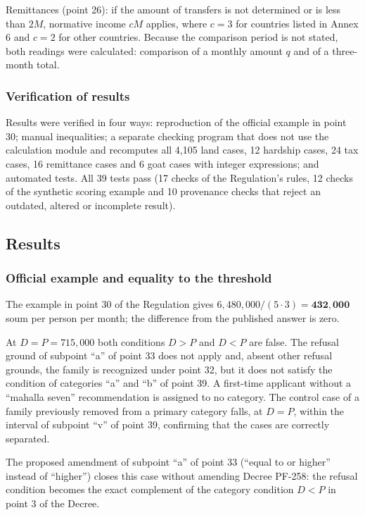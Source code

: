 \documentclass[14pt,a4paper]{extarticle}
\begin{document}
Remittances (point 26): if the amount of transfers is not determined or is less than $2M$, normative income $cM$ applies, where $c=3$ for countries listed in Annex 6 and $c=2$ for other countries. Because the comparison period is not stated, both readings were calculated: comparison of a monthly amount $q$ and of a three-month total.

\subsubsection{Verification of results}
Results were verified in four ways: reproduction of the official example in point 30; manual inequalities; a separate checking program that does not use the calculation module and recomputes all 4,105 land cases, 12 hardship cases, 24 tax cases, 16 remittance cases and 6 goat cases with integer expressions; and automated tests. All 39 tests pass (17 checks of the Regulation’s rules, 12 checks of the synthetic scoring example and 10 provenance checks that reject an outdated, altered or incomplete result).

\subsection{Results}
\subsubsection{Official example and equality to the threshold}\label{res:eq}
The example in point 30 of the Regulation gives $6{,}480{,}000/(5\cdot3)=\mathbf{432{,}000}$ soum per person per month; the difference from the published answer is zero.

At $D=P=715{,}000$ both conditions $D>P$ and $D<P$ are false. The refusal ground of subpoint “a” of point 33 does not apply and, absent other refusal grounds, the family is recognized under point 32, but it does not satisfy the condition of categories “a” and “b” of point 39. A first-time applicant without a “mahalla seven” recommendation is assigned to no category. The control case of a family previously removed from a primary category falls, at $D=P$, within the interval of subpoint “v” of point 39, confirming that the cases are correctly separated.

The proposed amendment of subpoint “a” of point 33 (“equal to or higher” instead of “higher”) closes this case without amending Decree PF-258: the refusal condition becomes the exact complement of the category condition $D<P$ in point 3 of the Decree.
\end{document}
